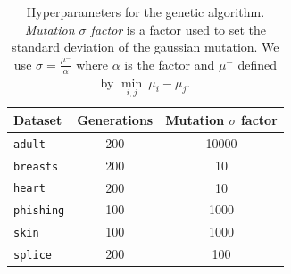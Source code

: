 \documentclass[preprint,12pt]{elsarticle}
\theoremstyle{definition}
\begin{document}
\begin{table}[h!]
\begin{center}
  \caption{Hyperparameters for the genetic algorithm. {\it Mutation $\sigma$ factor} is a factor used to set the standard deviation of the gaussian mutation. We use $\sigma = \frac{\mu^-}{\alpha}$ where $\alpha$ is the factor and $\mu^-$ defined by $\underset{i,j}{\min}{~ \mu_i - \mu_j}$.}
  \begin{small}
\begin{tabular}{|l|c|c|}
\hline
  Dataset & Generations & Mutation $\sigma$ factor \\ \hline
 \texttt{adult} & 200 & 10000 \\
  \texttt{breasts} & 200 & 10 \\
  \texttt{heart} & 200 & 10 \\
    \texttt{phishing} & 100 & 1000 \\
    \texttt{skin} & 100 & 1000 \\
    \texttt{splice} & 200 & 100 \\\hline
\end{tabular}
\end{small}
  \label{table:hyperparameters_ga}
\end{center}
\end{table}
\end{document}
